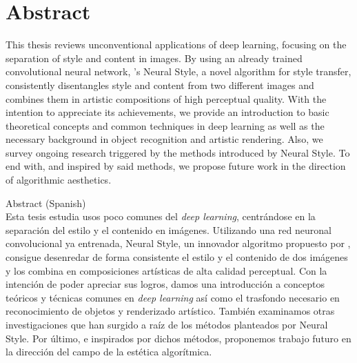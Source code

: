 
\chapter*{Abstract}
\vspace*{-10mm}

This thesis reviews unconventional applications of deep learning, focusing on the separation of style and content in images.
By using an already trained convolutional neural network, \citeauthor{Gatys2015B}'s Neural Style, a novel algorithm for style transfer, consistently disentangles style and content from two different images and combines them in artistic compositions of high perceptual quality.
With the intention to appreciate its achievements, we provide an introduction to basic theoretical concepts and common techniques in deep learning as well as the necessary background in object recognition and artistic rendering.
Also, we survey ongoing research triggered by the methods introduced by Neural Style.
To end with, and inspired by said methods, we propose future work in the direction of algorithmic aesthetics.


\vspace*{20mm}
{Abstract (Spanish)} \\

Esta tesis estudia usos poco comunes del \emph{deep learning}, centrándose en la separación del estilo y el contenido en imágenes.
Utilizando una red neuronal convolucional ya entrenada, Neural Style, un innovador algoritmo propuesto por \citeauthor{Gatys2015B}, consigue desenredar de forma consistente el estilo y el contenido de dos imágenes y los combina en composiciones artísticas de alta calidad perceptual.
Con la intención de poder apreciar sus logros, damos una introducción a conceptos teóricos y técnicas comunes en \emph{deep learning} así como el trasfondo necesario en reconocimiento de objetos y renderizado artístico.
También examinamos otras investigaciones que han surgido a raíz de los métodos planteados por Neural Style.
Por último, e inspirados por dichos métodos, proponemos trabajo futuro en la dirección del campo de la estética algorítmica.
